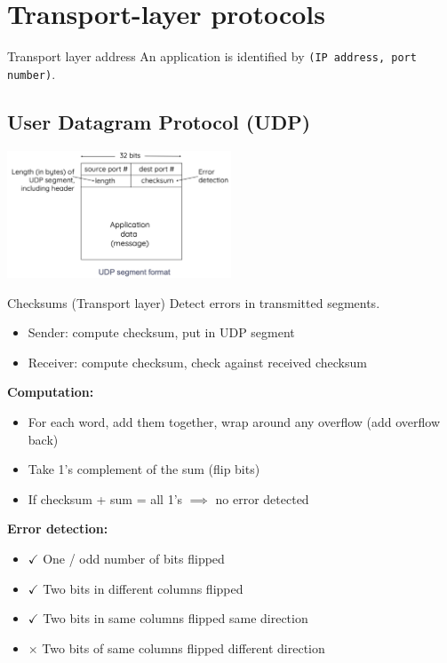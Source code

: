 \section{Transport-layer protocols}

\begin{knBox}
    {Transport layer address}
    An application is identified by \texttt{(IP address, port number)}.
\end{knBox}

\subsection{User Datagram Protocol (UDP)}

\includegraphics[width=0.5\textwidth]{images/m04-l01-1.png}

\begin{theorem}
    {Checksums (Transport layer)}
    Detect errors in transmitted segments.

    \begin{itemize}
        \item Sender: compute checksum, put in UDP segment
        \item Receiver: compute checksum, check against received checksum
    \end{itemize}

    \textbf{Computation:}

    \begin{itemize}
        \item For each word, add them together, wrap around any overflow (add overflow back)
        \item Take 1's complement of the sum (flip bits)
        \item If checksum + sum = all 1's $\implies$ no error detected
    \end{itemize}

    \textbf{Error detection:}
    \begin{itemize}
        \item $\checkmark$ One / odd number of bits flipped
        \item $\checkmark$ Two bits in different columns flipped
        \item $\checkmark$ Two bits in same columns flipped same direction
        \item $\times$ Two bits of same columns flipped different direction
    \end{itemize}
\end{theorem}

